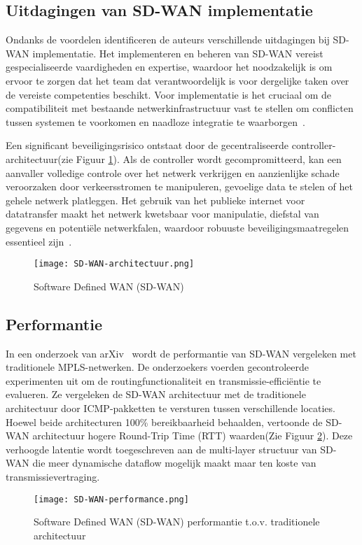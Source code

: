 \subsection{Uitdagingen van SD-WAN implementatie}
Ondanks de voordelen identificeren de auteurs verschillende uitdagingen bij SD-WAN implementatie. Het implementeren en beheren van SD-WAN vereist gespecialiseerde vaardigheden en expertise, waardoor het noodzakelijk is om ervoor te zorgen dat het team dat verantwoordelijk is voor dergelijke taken over de vereiste competenties beschikt. Voor implementatie is het cruciaal om de compatibiliteit met bestaande netwerkinfrastructuur vast te stellen om conflicten tussen systemen te voorkomen en naadloze integratie te waarborgen~\autocite{ijraset2025}.

\vspace{2ex}

Een significant beveiligingsrisico ontstaat door de gecentraliseerde controller-architectuur(zie Figuur \ref{fig:SD-WAN-architectuur}). Als de controller wordt gecompromitteerd, kan een aanvaller volledige controle over het netwerk verkrijgen en aanzienlijke schade veroorzaken door verkeersstromen te manipuleren, gevoelige data te stelen of het gehele netwerk platleggen. Het gebruik van het publieke internet voor datatransfer maakt het netwerk kwetsbaar voor manipulatie, diefstal van gegevens en potentiële netwerkfalen, waardoor robuuste beveiligingsmaatregelen essentieel zijn~\autocite{ijraset2025}.
\begin{figure}[H]
  \centering
  \texttt{[image: SD-WAN-architectuur.png]}
  \caption[SD-WAN architectuur]{Software Defined WAN (SD-WAN)~\autocite{ijraset2025}}
  \label{fig:SD-WAN-architectuur}
\end{figure}

\subsection{Performantie}
In een onderzoek van arXiv~\autocite{arxiv2025} wordt de performantie van SD-WAN vergeleken met traditionele MPLS-netwerken. De onderzoekers voerden gecontroleerde experimenten uit om de routingfunctionaliteit en transmissie-efficiëntie te evalueren. Ze vergeleken de SD-WAN architectuur met de traditionele architectuur door ICMP-pakketten te versturen tussen verschillende locaties. Hoewel beide architecturen 100\% bereikbaarheid behaalden, vertoonde de SD-WAN architectuur hogere Round-Trip Time (RTT) waarden(Zie Figuur \ref{fig:SD-WAN-performance}). Deze verhoogde latentie wordt toegeschreven aan de multi-layer structuur van SD-WAN die meer dynamische dataflow mogelijk maakt maar ten koste van transmissievertraging.
\begin{figure}[H]
  \centering
  \texttt{[image: SD-WAN-performance.png]}
  \caption[SD-WAN performantie]{Software Defined WAN (SD-WAN) performantie t.o.v. traditionele architectuur~\autocite{arxiv2025}}
  \label{fig:SD-WAN-performance}
\end{figure}

